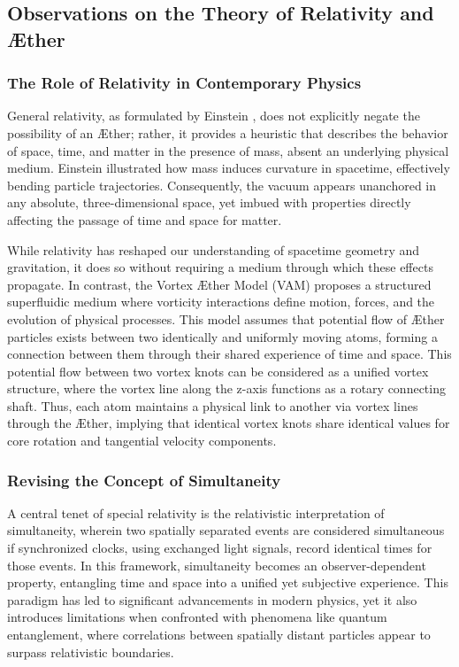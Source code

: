 
\subsection{Observations on the Theory of Relativity and Æther}\label{subsec:observations-on-the-theory-of-relativity}
\subsubsection*{The Role of Relativity in Contemporary Physics}
General relativity, as formulated by Einstein \cite{einstein_1905_4}, does not explicitly negate the possibility of an Æther; rather, it provides a heuristic that describes the behavior of space, time, and matter in the presence of mass, absent an underlying physical medium.
Einstein illustrated how mass induces curvature in spacetime, effectively bending particle trajectories.
Consequently, the vacuum appears unanchored in any absolute, three-dimensional space, yet imbued with properties directly affecting the passage of time and space for matter.

While relativity has reshaped our understanding of spacetime geometry and gravitation, it does so without requiring a medium through which these effects propagate.
In contrast, the Vortex Æther Model (VAM) proposes a structured superfluidic medium where vorticity interactions define motion, forces, and the evolution of physical processes.
This model assumes that potential flow of Æther particles exists between two identically and uniformly moving atoms, forming a connection between them through their shared experience of time and space.
This potential flow between two vortex knots can be considered as a unified vortex structure, where the vortex line along the z-axis functions as a rotary connecting shaft.
Thus, each atom maintains a physical link to another via vortex lines through the Æther, implying that identical vortex knots share identical values for core rotation and tangential velocity components.

\subsubsection*{Revising the Concept of Simultaneity}
A central tenet of special relativity is the relativistic interpretation of simultaneity, wherein two spatially separated events are considered simultaneous if synchronized clocks, using exchanged light signals, record identical times for those events.
In this framework, simultaneity becomes an observer-dependent property, entangling time and space into a unified yet subjective experience.
This paradigm has led to significant advancements in modern physics, yet it also introduces limitations when confronted with phenomena like quantum entanglement, where correlations between spatially distant particles appear to surpass relativistic boundaries.

